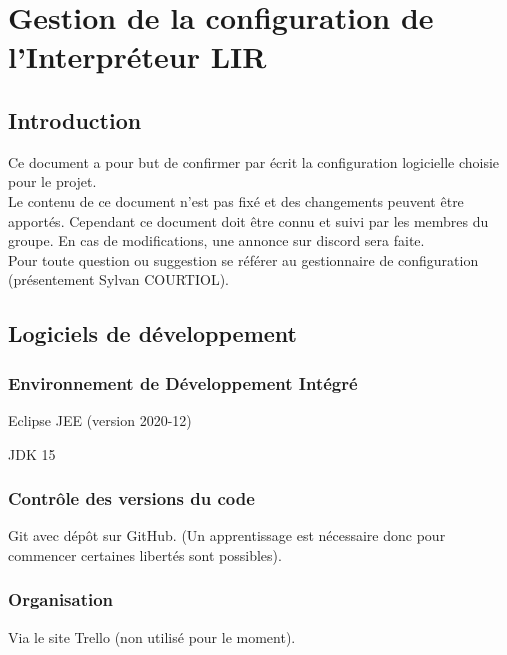 \documentclass[12pt,a4paper,titlepage,openany, oneside]{report}
\begin{document}
    \newpage

    \setcounter{section}{0}
    \renewcommand{\thesection}{\arabic{section}}
    \renewcommand{\thesubsection}{\arabic{section}.\arabic{subsection}}

    \chapter{Gestion de la configuration de l'Interpréteur LIR}

    \section*{Introduction}
    Ce document a pour but de confirmer par écrit la configuration logicielle choisie pour le projet.
    \\ Le contenu de ce document n’est pas fixé et des changements peuvent être
    apportés. Cependant ce document doit être connu et suivi par les membres du groupe.
    En cas de modifications, une annonce sur discord sera faite.
    \\ Pour toute question ou suggestion se référer au gestionnaire de configuration
    (présentement
    Sylvan COURTIOL).


    \normalsize
    \section{Logiciels de développement}
        \subsection{Environnement de Développement Intégré}
        Eclipse JEE (version 2020-12)
        \par JDK 15

        \subsection{Contrôle des versions du code}
        Git avec dépôt sur GitHub. (Un apprentissage est nécessaire
        donc pour commencer certaines libertés sont possibles).

        \subsection{Organisation}
        Via le site Trello (non utilisé pour le moment).
\end{document}
